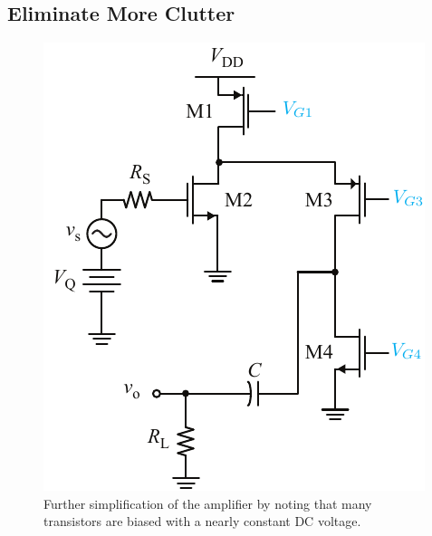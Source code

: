 \subsection{Eliminate More Clutter}
\begin{figure}[tb]
\begin{center}
\includegraphics[scale=1]{18cascode_folded_dc}
\end{center}
\caption{Further simplification of the amplifier by noting that many transistors are biased with a nearly constant DC voltage.}
\label{fig:18cascode_folded_dc}
\end{figure}

